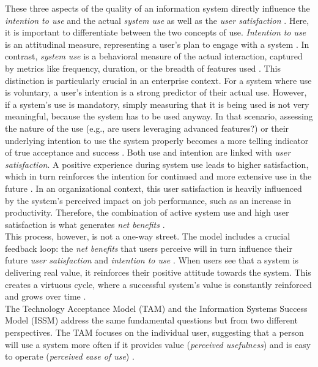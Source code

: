 \documentclass[
	english,
	ruledheaders=section,%
	class=report,%
	thesis={type=bachelor},%
	accentcolor=1b,%
	custommargins=true,%
	marginpar=false,%
	parskip=half-,%
	fontsize=11pt,%
	DIV=14,
]{tudapub}
\begin{document}
These three aspects of the quality of an information system directly influence the \textit{intention to use} and the actual \textit{system use} as well as the \textit{user satisfaction} \parencite[p.~23--24]{DeloneMcLean2003ISSuccessTenYearUpdate}. Here, it is important to differentiate between the two concepts of use. \textit{Intention to use} is an attitudinal measure, representing a user's plan to engage with a system \parencite[p.~23]{DeloneMcLean2003ISSuccessTenYearUpdate}. In contrast, \textit{system use} is a behavioral measure of the actual interaction, captured by metrics like frequency, duration, or the breadth of features used \parencite[p.~66]{DeloneMcLean1992ISSuccess}. This distinction is particularly crucial in an enterprise context. For a system where use is voluntary, a user's intention is a strong predictor of their actual use. However, if a system's use is mandatory, simply measuring that it is being used is not very meaningful, because the system has to be used anyway. In that scenario, assessing the nature of the use (e.g., are users leveraging advanced features?) or their underlying intention to use the system properly becomes a more telling indicator of true acceptance and success
\parencite[p.~66]{DeloneMcLean1992ISSuccess}. Both use and intention are linked with \textit{user satisfaction}. A positive experience during system use leads to higher satisfaction, which in turn reinforces the intention for continued and more extensive use in the future \parencite[p.~23]{DeloneMcLean2003ISSuccessTenYearUpdate}. In an organizational context, this user satisfaction is heavily influenced by the system's perceived impact on job performance, such as an increase in productivity. Therefore, the combination of active system use and high user satisfaction is what generates \textit{net benefits} \parencite[p.~23]{DeloneMcLean2003ISSuccessTenYearUpdate}.\\
This process, however, is not a one-way street. The model includes a crucial feedback loop: the \textit{net benefits} that users perceive will in turn influence their future \textit{user satisfaction} and \textit{intention to use} \parencite[p.~23-24]{DeloneMcLean2003ISSuccessTenYearUpdate}. When users see that a system is delivering real value, it reinforces their positive attitude towards the system. This creates a virtuous cycle, where a successful system's value is constantly reinforced and grows over time \parencite[p.~23]{DeloneMcLean2003ISSuccessTenYearUpdate}.\\
The Technology Acceptance Model (TAM) and the Information Systems Success Model (ISSM) address the same fundamental questions but from two different perspectives. The TAM focuses on the individual user, suggesting that a person will use a system more often if it provides value (\textit{perceived usefulness}) and is easy to operate (\textit{perceived ease of use}) \parencite[p.~320]{Davis1989}.
\end{document}
